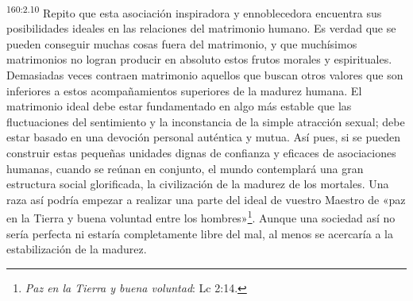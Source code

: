\par 
\textsuperscript{160:2.10} Repito que esta asociación inspiradora y ennoblecedora encuentra sus posibilidades ideales en las relaciones del matrimonio humano. Es verdad que se pueden conseguir muchas cosas fuera del matrimonio, y que muchísimos matrimonios no logran producir en absoluto estos frutos morales y espirituales. Demasiadas veces contraen matrimonio aquellos que buscan otros valores que son inferiores a estos acompañamientos superiores de la madurez humana. El matrimonio ideal debe estar fundamentado en algo más estable que las fluctuaciones del sentimiento y la inconstancia de la simple atracción sexual; debe estar basado en una devoción personal auténtica y mutua. Así pues, si se pueden construir estas pequeñas unidades dignas de confianza y eficaces de asociaciones humanas, cuando se reúnan en conjunto, el mundo contemplará una gran estructura social glorificada, la civilización de la madurez de los mortales. Una raza así podría empezar a realizar una parte del ideal de vuestro Maestro de «paz en la Tierra y buena voluntad entre los hombres»\footnote{\textit{Paz en la Tierra y buena voluntad}: Lc 2:14.}. Aunque una sociedad así no sería perfecta ni estaría completamente libre del mal, al menos se acercaría a la estabilización de la madurez.

